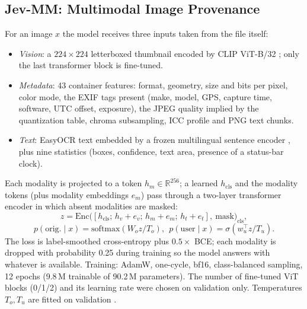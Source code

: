 \documentclass[conference]{IEEEtran}
\begin{document}
\subsection{Jev-MM: Multimodal Image Provenance}\label{sec:jevmm}
For an image $x$ the model receives three inputs taken from the file itself:
\begin{itemize}
\item \emph{Vision}: a $224\times224$ letterboxed thumbnail encoded by CLIP ViT-B/32 \cite{clip}; only the last
transformer block is fine-tuned.
\item \emph{Metadata}: 43 container features: format, geometry, size and bits per pixel, color mode, the EXIF tags
present (make, model, GPS, capture time, software, UTC offset, exposure), the JPEG quality implied by the
quantization table, chroma subsampling, ICC profile and PNG text chunks.
\item \emph{Text}: EasyOCR text embedded by a frozen multilingual sentence encoder \cite{sbert}, plus nine
statistics (boxes, confidence, text area, presence of a status-bar clock).
\end{itemize}
Each modality is projected to a token $h_m\in\mathbb{R}^{256}$; a learned $h_{\text{cls}}$ and the modality tokens
(plus modality embeddings $e_m$) pass through a two-layer transformer encoder in which absent modalities are masked:
\begin{equation}
z = \mathrm{Enc}\big([h_{\text{cls}};\, h_v+e_v;\, h_m+e_m;\, h_t+e_t],\ \text{mask}\big)_{\text{cls}},
\end{equation}
\begin{equation}
p(\text{orig.}\mid x)=\mathrm{softmax}(W_o z / T_o),\ \ p(\text{user}\mid x)=\sigma(w_u^\top z / T_u).
\end{equation}
The loss is label-smoothed cross-entropy plus $0.5\times$ BCE; each modality is dropped with probability 0.25 during
training so the model answers with whatever is available. Training: AdamW, one-cycle, bf16, class-balanced sampling,
12 epochs (9.8\,M trainable of 90.2\,M parameters). The number of fine-tuned ViT blocks (0/1/2) and its learning rate
were chosen on validation only. Temperatures $T_o,T_u$ are fitted on validation \cite{guo2017}.
\end{document}
